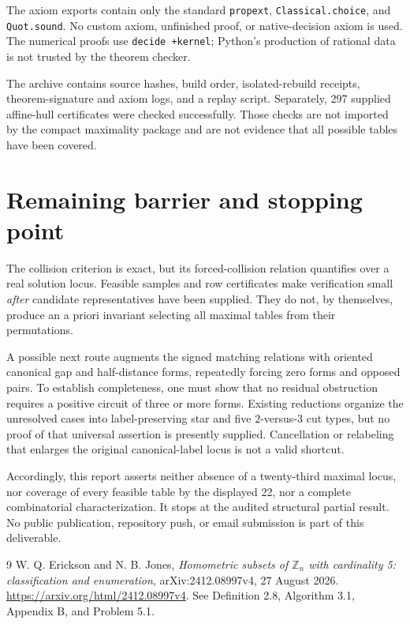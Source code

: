 \documentclass[11pt]{article}
\begin{document}
The axiom exports contain only the standard \texttt{propext}, \texttt{Classical.choice}, and \texttt{Quot.sound}. No custom axiom, unfinished proof, or native-decision axiom is used. The numerical proofs use \texttt{decide +kernel}; Python's production of rational data is not trusted by the theorem checker.

The archive contains source hashes, build order, isolated-rebuild receipts, theorem-signature and axiom logs, and a replay script. Separately, 297 supplied affine-hull certificates were checked successfully. Those checks are not imported by the compact maximality package and are not evidence that all possible tables have been covered.

\section{Remaining barrier and stopping point}
The collision criterion is exact, but its forced-collision relation quantifies over a real solution locus. Feasible samples and row certificates make verification small \emph{after} candidate representatives have been supplied. They do not, by themselves, produce an a priori invariant selecting all maximal tables from their permutations.

A possible next route augments the signed matching relations with oriented canonical gap and half-distance forms, repeatedly forcing zero forms and opposed pairs. To establish completeness, one must show that no residual obstruction requires a positive circuit of three or more forms. Existing reductions organize the unresolved cases into label-preserving star and five $2$-versus-$3$ cut types, but no proof of that universal assertion is presently supplied. Cancellation or relabeling that enlarges the original canonical-label locus is not a valid shortcut.

Accordingly, this report asserts neither absence of a twenty-third maximal locus, nor coverage of every feasible table by the displayed 22, nor a complete combinatorial characterization. It stops at the audited structural partial result. No public publication, repository push, or email submission is part of this deliverable.

\begin{thebibliography}{9}
 W. Q. Erickson and N. B. Jones,
\emph{Homometric subsets of $\mathbb Z_n$ with cardinality 5: classification and enumeration},
arXiv:2412.08997v4, 27 August 2026.
\url{https://arxiv.org/html/2412.08997v4}.
See Definition 2.8, Algorithm 3.1, Appendix B, and Problem 5.1.
\end{thebibliography}
\end{document}
